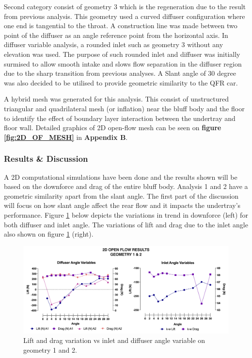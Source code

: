 \noindent Second category consist of geometry 3 which is the regeneration due to the result from previous analysis. This geometry used a curved diffuser configuration where one end is tangential to the throat. A construction line was made between two point of the diffuser as an angle reference point from the horizontal axis. In diffuser variable analysis, a rounded inlet such as geometry 3 without any elevation was used. The purpose of such rounded inlet and diffuser was initially surmised to allow smooth intake and slows flow separation in the diffuser region due to the sharp transition from previous analyses. A Slant angle of 30 degree was also decided to be utilised to provide geometric similarity to the QFR car.

\noindent A hybrid mesh was generated for this analysis. This consist of unstructured triangular and quadrilateral mesh (or inflation) near the bluff body and the floor to identify the effect of boundary layer interaction between the undertray and floor wall.  Detailed graphics of 2D open-flow mesh can be seen on \textbf{figure \ref{fig:2D_OF_MESH}} in \textbf{Appendix B}.



\subsubsection{Results \& Discussion}

\noindent A 2D computational simulations have been done and the results shown will be based on the downforce and drag of the entire bluff body. Analysis 1 and 2 have a geometric similarity apart from the slant angle. The first part of the discussion will focus on how slant angle affect the rear flow and it impacts the undertray's performance. Figure \ref{fig:2D_OF_A12_results} below depicts the variations in trend in downforce (left) for both diffuser and inlet angle. The variations of lift and drag due to the inlet angle also shown on figure \ref{fig:2D_OF_A12_results} (right).

\begin{figure}[!ht]
    \centering
    \includegraphics[scale = 0.6]{Figures/Graph/2D_OF_A1-2.png}
    \caption{Lift and drag variation vs inlet and diffuser angle variable on geometry 1 and 2. }
    \label{fig:2D_OF_A12_results}
\end{figure}

